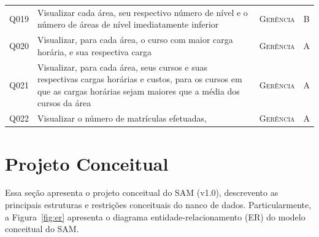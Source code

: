 \documentclass{article}
\begin{document}
\begin{table}[!htb]
\begin{tabularx}{\textwidth}{p{0.65cm} m{11.0cm} p{1.75cm} c}
		Q019 & Visualizar cada área, seu respectivo número de nível e o número de áreas de nível imediatamente inferior & \textsc{Ger\^encia} & B \\
		Q020 & Visualizar, para cada área, o curso com maior carga horária, e sua respectiva carga & \textsc{Ger\^encia} & A \\
		Q021 & Visualizar, para cada área, seus cursos e suas respectivas cargas horárias e custos, para os cursos em que as cargas horárias sejam maiores que a média dos cursos da área & \textsc{Ger\^encia} & A \\
		Q022 & Visualizar o número de matrículas efetuadas, & \textsc{Ger\^encia} & A \\
		\bottomrule
	\end{tabularx}
    \label{tab:query}
\end{table}



\clearpage
\section{Projeto Conceitual}
\label{sec:projetoconceitual}
Essa se\c{c}\~ao apresenta o projeto conceitual do SAM (v1.0), descrevento as principais estruturas e restri\c{c}\~oes conceituais do nanco de dados. Particularmente, a Figura~\ref{fig:er} apresenta o diagrama entidade-relacionamento (ER) do modelo conceitual do SAM.
\end{document}
